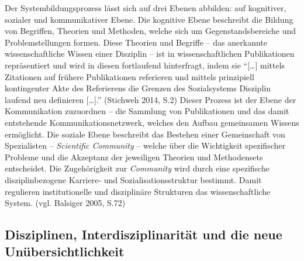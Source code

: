\documentclass[a4paper,
fontsize=11pt,
oneside,
numbers=noperiodatend,
parskip=half-,
bibliography=totoc,
final
]{scrartcl}
\begin{document}
Der Systembildungsprozess lässt sich auf drei Ebenen abbilden: auf
kognitiver, sozialer und kommunikativer Ebene. Die kognitive Ebene
beschreibt die Bildung von Begriffen, Theorien und Methoden, welche sich
um Gegenstandsbereiche und Problemstellungen formen. Diese Theorien und
Begriffe -- das anerkannte wissenschaftliche Wissen einer Disziplin --
ist in wissenschaftlichen Publikationen repräsentiert und wird in diesen
fortlaufend hinterfragt, indem sie \enquote{{[}\ldots{}{]} mittels
Zitationen auf frühere Publikationen referieren und mittels prinzipiell
kontingenter Akte des Referierens die Grenzen des Sozialsystems
Disziplin laufend neu definieren {[}\ldots{}{]}.} (Stichweh 2014, S.2)
Dieser Prozess ist der Ebene der Kommunikation zuzuordnen -- die
Sammlung von Publikationen und das damit entstehende
Kommunikationsnetzwerk, welches den Aufbau gemeinsamen Wissens
ermöglicht. Die soziale Ebene beschreibt das Bestehen einer Gemeinschaft
von Spezialisten -- \emph{Scientific Community} -- welche über die
Wichtigkeit spezifischer Probleme und die Akzeptanz der jeweiligen
Theorien und Methodensets entscheidet. Die Zugehörigkeit zur
\emph{Community} wird durch eine spezifische disziplinbezogene Karriere-
und Sozialisationsstruktur bestimmt. Damit regulieren institutionelle
und disziplinäre Strukturen das wissenschaftliche System. (vgl. Balsiger
2005, S.72)

\subsection*{Disziplinen, Interdisziplinarität und die neue
Unübersichtlichkeit}\label{disziplinen-interdisziplinarituxe4t-und-die-neue-unuxfcbersichtlichkeit}
\end{document}

